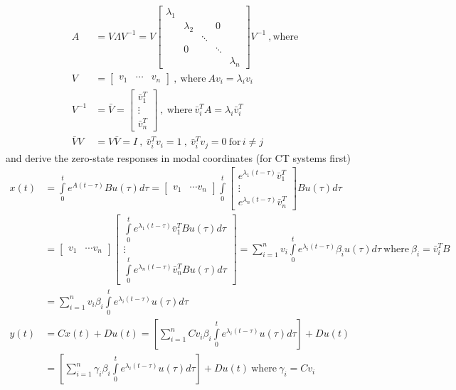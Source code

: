 \documentclass[twoside]{article}
\begin{document}
\begin{align*}
	A &= V \Lambda V^{-1} = V \left[ \begin{array}{ccccc} \lambda_1 &  & & &  \\  & \lambda_2  &  & 0 &  \\ &  & \ddots & \\ & 0 & & \ddots & \\ & &  & &  \lambda_n \end{array} \right] V^{-1} \ , \mathrm{where}
	\\
	 V &= \left[ \begin{array}{ccc} v_1 & \cdots & v_n \end{array} \right] \ , \ \mathrm{where} \ A v_i = \lambda_i v_i 
 \\
 V^{-1} &= \bar{V} =  \left[ \begin{array}{c} \bar{v}_1^T \\ \vdots \\ \bar{v}_n^T \end{array} \right] \ , \ \mathrm{where} \ \bar{v}_i^T A = \lambda_i \bar{v}_i^T
  \\
\bar{V} V &= V \bar{V} = I \ , \ \bar{v}_i^T v_i = 1 \ , \  \bar{v}_i^T v_j = 0 \ \mathrm{for} \, i \neq j
\end{align*}
%
and derive the zero-state responses in modal coordinates (for CT
systems first)
%
\begin{align*}
	x(t) &= \int\limits_{0}^{t} e^{A ( t - \tau ) } B u(\tau) d \tau = \left[ \begin{array}{ccc} v_1 & \cdots v_n \end{array} \right] \int\limits_{0}^{t} 
	\left[ \begin{array}{c} e^{\lambda_1 (t - \tau)} \bar{v}_1^T \\  \vdots \\ e^{\lambda_n (t - \tau)} \bar{v}_n^T \end{array} \right]  B u(\tau) d \tau
\\
&= \left[ \begin{array}{ccc} v_1 & \cdots v_n \end{array} \right] 
	\left[ \begin{array}{c} \int\limits_{0}^{t}  e^{\lambda_1 (t - \tau)} \bar{v}_1^T B u(\tau) d \tau \\  \vdots \\ \int\limits_{0}^{t} e^{\lambda_n (t - \tau)} \bar{v}_n^T B u(\tau) d \tau \end{array} \right]  
	=  \sum\limits_{i=1}^n v_i \int\limits_{0}^{t} e^{\lambda_i (t - \tau)} \beta_i u(\tau) d \tau \ \mathrm{where} \ \beta_i = \bar{v}_i^T B
	\\
	&= \sum\limits_{i=1}^n v_i \beta_i \int\limits_{0}^{t} e^{\lambda_i (t - \tau)} u(\tau) d \tau 
	\\
	y(t) &= C x(t) + D u(t) = \left[ \sum\limits_{i=1}^n C v_i \beta_i \int\limits_{0}^{t} e^{\lambda_i (t - \tau)} u(\tau) d \tau \right] + D u(t)
	\\ &= \left[ \sum\limits_{i=1}^n \gamma_i  \beta_i \int\limits_{0}^{t} e^{\lambda_i (t - \tau)} u(\tau) d \tau \right] + D u(t) \ \mathrm{where} \ \gamma_i = C v_i
\end{align*}
\end{document}
